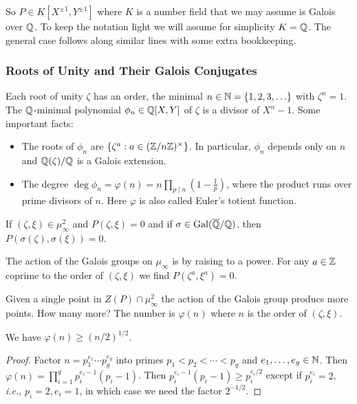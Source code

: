 So $P \in K[X^{\pm 1},Y^{\pm 1}]$ where $K$ is a number field that we may assume is
Galois over ${\mathbb{Q}}$. To keep the notation light we will assume for
simplicity $K={\mathbb{Q}}$. The general case follows along similar lines with
some extra bookkeeping.

\subsubsection{Roots of Unity and Their Galois Conjugates}
\label{sec:rootsof1}
Each root of unity $\zeta$ has an order, the minimal
$n\in{\mathbb{N}}=\{1,2,3,\ldots\}$
with
$\zeta^n=1$. The ${\mathbb{Q}}$-minimal polynomial $\phi_n\in{\mathbb{Q}}[X,Y]$
of $\zeta$ is a divisor of
$X^n-1$. Some important facts:

\begin{itemize}
\item The roots of $\phi_n$ are $\{\zeta^a : a\in
  ({\mathbb{Z}}/n{\mathbb{Z}})^\times\}$. In particular, $\phi_n$ depends only on $n$
  and ${\mathbb{Q}}(\zeta)/{\mathbb{Q}}$ is a Galois extension. 
\item The degree $\deg \phi_n = \varphi(n)= n \prod_{p\mid n}
  \left(1-\frac 1p\right)$, where the product runs over prime divisors
  of $n$. Here $\varphi$ is also called Euler's totient function.
\end{itemize}

\begin{crucial}
  If $(\zeta,\xi)\in \mu_\infty^2$ and $P(\zeta,\xi)=0$ and if
  $\sigma\in \mathrm{Gal}({\overline{\mathbb{Q}}}/{\mathbb{Q}})$, then
  $P(\sigma(\zeta),\sigma(\xi))=0$.

  The action of the Galois groups on $\mu_\infty$ is by raising to a
  power. For any $a\in{\mathbb{Z}}$ coprime to the order of $(\zeta,\xi)$  
  we find $P(\zeta^a,\xi^a)=0$. 
\end{crucial}

Given a single point in $Z(P)\cap\mu_\infty^2$ the action of the
Galois group producs more points. How many more? The number is
$\varphi(n)$ where $n$ is the order of $(\zeta,\xi)$. 

\begin{lemma}
  \label{lem:lgo}
  We have $\varphi(n) \ge (n/2)^{1/2}$. 
\end{lemma}
\begin{proof}
  Factor $n=p_1^{e_1}\cdots p_g^{e_g}$ into primes $p_1<p_2<\cdots <
  p_g$ and $e_1,\ldots,e_g\in{\mathbb{N}}$. Then $\varphi(n) = \prod_{i=1}^g
  p_i^{e_i-1}(p_i-1)$. Then $p_i^{e_i-1}(p_i-1)\ge p_i^{e_i/2}$ except
  if $p_i^{e_i}=2$, \textit{i.e.}, $p_i=2,e_i=1$, in which case we
  need the factor $2^{-1/2}$. 
\end{proof}


